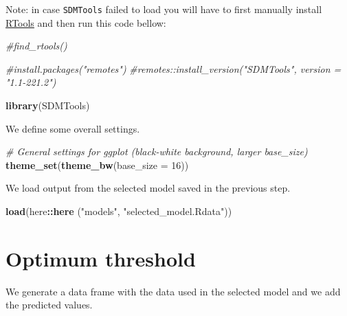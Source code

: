 \documentclass[
]{book}
\newenvironment{Shaded}{\begin{snugshade}}{\end{snugshade}}
\newcommand{\AttributeTok}[1]{\textcolor[rgb]{0.13,0.29,0.53}{#1}}
\newcommand{\CommentTok}[1]{\textcolor[rgb]{0.56,0.35,0.01}{\textit{#1}}}
\newcommand{\DecValTok}[1]{\textcolor[rgb]{0.00,0.00,0.81}{#1}}
\newcommand{\FunctionTok}[1]{\textcolor[rgb]{0.13,0.29,0.53}{\textbf{#1}}}
\newcommand{\NormalTok}[1]{#1}
\newcommand{\OtherTok}[1]{\textcolor[rgb]{0.56,0.35,0.01}{#1}}
\newcommand{\SpecialCharTok}[1]{\textcolor[rgb]{0.81,0.36,0.00}{\textbf{#1}}}
\newcommand{\StringTok}[1]{\textcolor[rgb]{0.31,0.60,0.02}{#1}}
\begin{document}
Note: in case \texttt{SDMTools} failed to load you will have to first manually install \href{https://cran.r-project.org/bin/windows/Rtools/history.html}{RTools} and then run this code bellow:

\begin{Shaded}
\begin{Highlighting}[]
\CommentTok{\#find\_rtools()}
 
\CommentTok{\#install.packages("remotes")}
\CommentTok{\#remotes::install\_version("SDMTools", version = "1.1{-}221.2")}

\FunctionTok{library}\NormalTok{(SDMTools)}
\end{Highlighting}
\end{Shaded}

We define some overall settings.

\begin{Shaded}
\begin{Highlighting}[]
\CommentTok{\# General settings for ggplot (black{-}white background, larger base\_size)}
\FunctionTok{theme\_set}\NormalTok{(}\FunctionTok{theme\_bw}\NormalTok{(}\AttributeTok{base\_size =} \DecValTok{16}\NormalTok{))}
\end{Highlighting}
\end{Shaded}

We load output from the selected model saved in the previous step.

\begin{Shaded}
\begin{Highlighting}[]
\FunctionTok{load}\NormalTok{(here}\SpecialCharTok{::}\FunctionTok{here}\NormalTok{ (}\StringTok{"models"}\NormalTok{, }\StringTok{"selected\_model.Rdata"}\NormalTok{))}
\end{Highlighting}
\end{Shaded}

\section{Optimum threshold}\label{optimum-threshold}

We generate a data frame with the data used in the selected model and we add the predicted values.

\begin{Shaded}
\end{Shaded}
\end{document}
